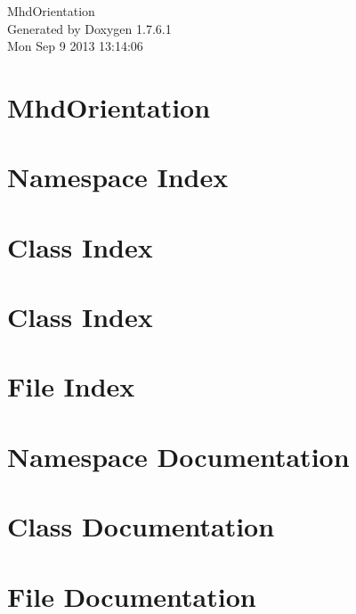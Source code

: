 \documentclass[a4paper]{book}
\begin{document}
\hypersetup{pageanchor=false,citecolor=blue}
\begin{titlepage}
\vspace*{7cm}
\begin{center}
{\Large \-Mhd\-Orientation }\\
\vspace*{1cm}
{\large \-Generated by Doxygen 1.7.6.1}\\
\vspace*{0.5cm}
{\small Mon Sep 9 2013 13:14:06}\\
\end{center}
\end{titlepage}
\clearemptydoublepage
{}
\tableofcontents
\clearemptydoublepage
{}
\hypersetup{pageanchor=true,citecolor=blue}
\chapter{\-Mhd\-Orientation}
\label{index}\hypertarget{index}{}
\chapter{\-Namespace \-Index}

\chapter{\-Class \-Index}

\chapter{\-Class \-Index}

\chapter{\-File \-Index}

\chapter{\-Namespace \-Documentation}


\chapter{\-Class \-Documentation}









\chapter{\-File \-Documentation}














\printindex
\end{document}
